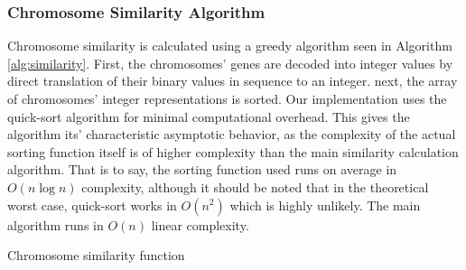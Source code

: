 \documentclass{sig-alternate}
\begin{document}
\subsubsection{Chromosome Similarity Algorithm}
Chromosome similarity is calculated using a greedy algorithm seen in Algorithm \ref{alg:similarity}. First, the chromosomes' genes are decoded into integer values by direct translation of their binary values in sequence to an integer. next, the array of chromosomes' integer representations is sorted. Our implementation uses the quick-sort algorithm for minimal computational overhead. This gives the algorithm its' characteristic asymptotic behavior, as the complexity of the actual sorting function itself is of higher complexity than the main similarity calculation algorithm. That is to say, the sorting function used runs on average in $O(n \log n)$ complexity, although it should be noted that in the theoretical worst case, quick-sort works in $O(n^2)$ which is highly unlikely. The main algorithm runs in $O(n)$ linear complexity.

\begin{algorithm}
  \SetAlgoLined
  \DontPrintSemicolon
  
\caption{Chromosome similarity function}
\label{alg:similarity}
\end{algorithm}
\end{document}
